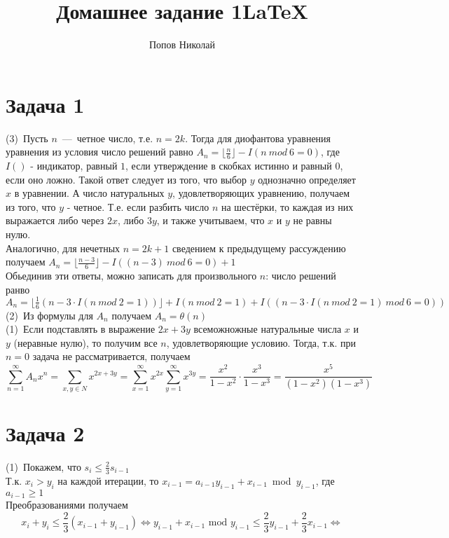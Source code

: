 \documentclass[a4paper,12pt]{article} %
\author{Попов Николай}
\title{Домашнее задание 1\LaTeX{}}
\begin{document}
\section*{Задача 1}

(3)~Пусть $n$~---~четное число, т.е. $n = 2k $. Тогда для диофантова уравнения уравнения из условия число решений равно $ A_n = \lfloor\frac{n}{6}\rfloor - I(n~mod~6 = 0) $, где $I()$ - индикатор, равный $1$, если утверждение в скобках истинно и равный 0, если оно ложно. Такой ответ следует из того, что выбор $y$ однозначно определяет $x$ в уравнении. А число натуральных $y$, удовлетворяющих уравнению, получаем из того, что $y$ - четное. Т.е. если разбить число $n$ на шестёрки, то каждая из них выражается либо через $2x$, либо $3y$, и также учитываем, что $x $ и  $y $ не равны нулю.\\

Аналогично, для нечетных $n = 2k+1$ сведением к предыдущему рассуждению  получаем $ A_n = \lfloor \frac{n - 3}{6}\rfloor - I((n-3)~mod~6 = 0) + 1$\\

Обьединив эти ответы, можно записать для произвольного $ n$: число решений ранво $ A_n = \lfloor \frac{1}{6}(n - 3\cdot I(n~mod~2 = 1))\rfloor + I(n~mod~2 = 1) + I((n - 3\cdot I(n~mod~2 = 1)~mod~6 = 0 ))$  \\

(2)~Из формулы для $A_n$ получаем $A_n = \theta(n)$\\

(1)~Если подставлять в выражение $ 2x+3y$ всеможножные натуральные числа $x $ и $y$ (неравные нулю), то получим все $n$, удовлетворяющие условию. Тогда, т.к. при $n = 0$ задача не рассматривается, получаем
\[
	\sum_{n=1}^{\infty}{A_nx^n} = \sum_{x, y\in N}{x^{2x+3y}}  = \sum_{x=1}^{\infty}{x^{2x}}\sum_{y=1}^{\infty}{x^{3y}} = \dfrac{x^2}{1-x^2}\cdot\dfrac{x^3}{1-x^3} = \dfrac{x^5}{(1-x^2)(1-x^3)}
\]
 

\section*{Задача 2}

(1)~Покажем, что $s_i \leq \frac{2}{3}s_{i-1}$\\
Т.к. $x_i > y_i$ на каждой итерации, то $x_{i-1} = a_{i-1}y_{i-1} + x_{i-1}$~mod~$y_{i-1}$, где $a_{i-1}\geq 1$\\
Преобразованиями получаем
\[
	x_{i}+y_{i} \leq \frac{2}{3}(x_{i-1}+y_{i-1}) \Leftrightarrow y_{i-1} + x_{i-1}\text{~mod~}y_{i-1}\leq \dfrac{2}{3}y_{i-1}+\frac{2}{3}x_{i-1}\Leftrightarrow \]
\end{document}
